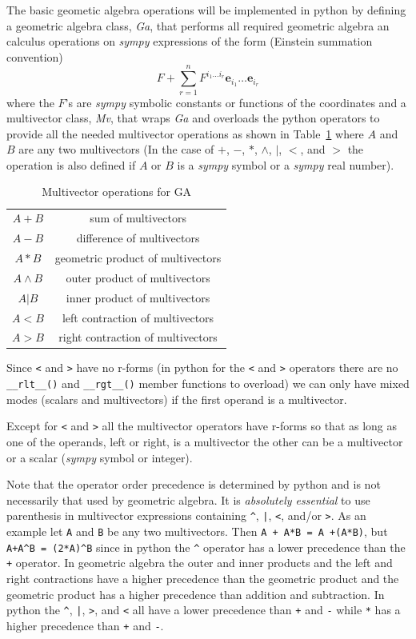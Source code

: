 \documentclass[12pt]{report}
\newcommand{\bm}[1]{\boldsymbol{#1}}
\newcommand{\W}{\wedge}
\newcommand{\be}{\begin{equation}}
\newcommand{\ee}{\end{equation}}
\newcommand{\eb}{\bm{e}}
\newcommand{\T}[1]{\texttt{#1}}
\begin{document}
The basic geometic algebra operations will be implemented in python by defining
a geometric algebra class, {\em Ga}, that performs all required geometric algebra an
calculus operations on \emph{sympy} expressions of the form (Einstein summation convention)
\be
   F +\sum_{r=1}^{n}F^{i_{1}\dots i_{r}}\eb_{i_{1}}\dots\eb_{i_{r}}
\ee
where the $F$'s are \emph{sympy} symbolic constants or functions of the 
coordinates and a multivector class, {\em Mv}, that wraps {\em Ga} and overloads the python operators to provide
all the needed multivector operations as shown in Table~\ref{ops}
 where $A$ and $B$  are any two multivectors (In the case of
$+$, $-$, $*$, $\W$, $|$, $<$, and $>$ the operation is also defined if $A$ or
$B$ is a \emph{sympy} symbol or a \emph{sympy} real number).

\begin{table}
\begin{center}
\begin{longtable}{cc}
    $A+B$ & sum of multivectors \\
    $A-B$ & difference of multivectors \\
    $A*B$ & geometric product of multivectors \\
    $A\W B$ & outer product of multivectors \\
    $A|B$ & inner product of multivectors \\
    $A<B$ & left contraction of multivectors \\
    $A>B$ & right contraction of multivectors 
\end{longtable}
\end{center}
\caption{Multivector operations for GA}\label{ops}
\end{table}

Since \T{<} and \T{>} have no r-forms (in python for the \T{<} and \T{>} operators there are no \lstinline$__rlt__()$ and
 \lstinline$__rgt__()$ member functions to overload)
we can only have mixed modes (scalars and multivectors) if the first operand is a multivector.


    Except for \T{<} and \T{>} all the multivector operators have r-forms so that as long as one of the
    operands, left or right, is a multivector the other can be a multivector or a scalar (\emph{sympy} symbol or integer).

    Note that the operator order precedence is determined by python and is not
    necessarily that used by geometric algebra. It is \emph{absolutely essential} to
    use parenthesis in multivector
    expressions containing \T{\^}, \T{|}, \T{<}, and/or \T{>}.  As an example let
    \T{A} and \T{B} be any two multivectors. Then \T{A + A*B = A +(A*B)}, but
    \lstinline!A+A^B = (2*A)^B! since in python the \T{\^} operator has a lower precedence
    than the \T{+} operator.  In geometric algebra the outer and inner products and
    the left and right contractions have a higher precedence than the geometric
    product and the geometric product has a higher precedence than addition and
    subtraction.  In python the \T{\^}, \T{|}, \T{>}, and \T{<} all have a lower
    precedence than \T{+} and \T{-} while \T{*} has a higher precedence than
    \T{+} and \T{-}.
\end{document}
